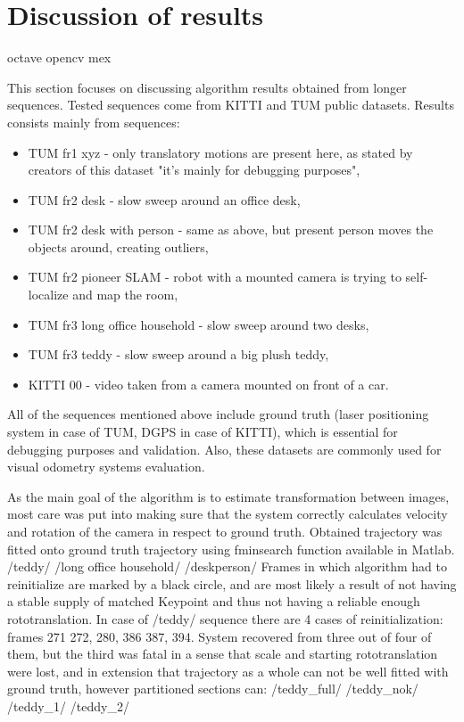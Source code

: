 \chapter{Discussion of results}
octave opencv mex

This section focuses on discussing algorithm results obtained from longer sequences. Tested sequences come from KITTI and TUM public datasets. Results consists mainly from sequences:
\begin{itemize}
	\item TUM fr1 xyz - only translatory motions are present here, as stated by creators of this dataset "it's mainly for debugging purposes",
	\item TUM fr2 desk - slow sweep around an office desk,
	\item TUM fr2 desk with person - same as above, but present person moves the objects around, creating outliers,
	\item TUM fr2 pioneer SLAM - robot with a mounted camera is trying to self-localize and map the room,
	\item TUM fr3 long office household - slow sweep around two desks,
	\item TUM fr3 teddy - slow sweep around a big plush teddy,
	\item KITTI 00 - video taken from a camera mounted on front of a car.
\end{itemize}
All of the sequences mentioned above include ground truth (laser positioning system in case of TUM, DGPS in case of KITTI), which is essential for debugging purposes and validation. Also, these datasets are commonly used for visual odometry systems evaluation.

As the main goal of the algorithm is to estimate transformation between images, most care was put into making sure that the system correctly calculates velocity and rotation of the camera in respect to ground truth. Obtained trajectory was fitted onto ground truth trajectory using fminsearch function available in Matlab.
/teddy/
/long office household/
/deskperson/
Frames in which algorithm had to reinitialize are marked by a black circle, and are most likely a result of not having a stable supply of matched Keypoint and thus not having a reliable enough rototranslation. In case of /teddy/ sequence there are 4 cases of reinitialization: frames 271 272, 280, 386 387, 394. System recovered from three out of four of them, but the third was fatal in a sense that scale and starting rototranslation were lost, and in extension that trajectory as a whole can not be well fitted with ground truth, however partitioned sections can:
/teddy\_full/
/teddy\_nok/
/teddy\_1/
/teddy\_2/


